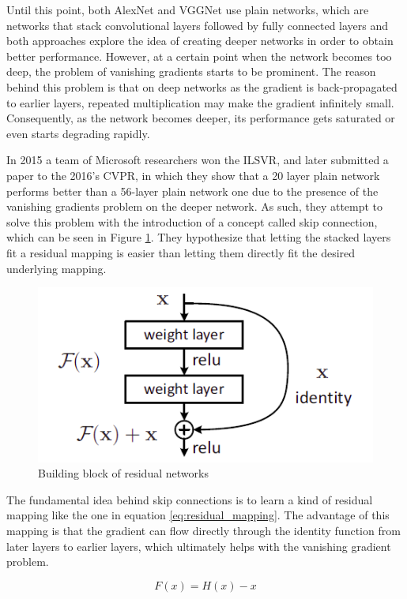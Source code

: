     Until this point, both AlexNet and VGGNet use plain networks, which are networks that stack convolutional layers followed by fully connected layers and both approaches explore the idea of creating deeper networks in order to obtain better performance. However, at a certain point when the network becomes too deep, the problem of vanishing gradients starts to be prominent. The reason behind this problem is that on deep networks as the gradient is back-propagated to earlier layers, repeated multiplication may make the gradient infinitely small. Consequently, as the network becomes  deeper, its performance gets saturated or even starts degrading rapidly. \par
    In 2015 a team of Microsoft researchers won the ILSVR, and later submitted a paper to the 2016's CVPR, in which they show that a 20 layer plain network performs better than a 56-layer plain network one due to the presence of the vanishing gradients problem on the deeper network. As such, they attempt to solve this problem with the introduction of a concept called skip connection, which can be seen in Figure \ref{fig:skip_connection}. They hypothesize that letting the stacked layers fit a residual mapping is easier than letting them directly fit the desired underlying mapping. \par
    \begin{figure}[ht]
      \centering
        \includegraphics[width=0.5\linewidth]{figs/skip_connection.png}
      \caption{Building block of residual networks \cite{resnet}}
      \label{fig:skip_connection}
    \end{figure}
    \par
    The fundamental idea behind skip connections is to learn a kind of residual mapping like the one in equation \ref{eq:residual_mapping}. The advantage of this mapping is that the gradient can flow directly through the identity function from later layers to earlier layers, which ultimately helps with the vanishing gradient problem.  \par
    \begin{equation}
        F(x)=H(x)-x
        \label{eq:residual_mapping}
    \end{equation}
